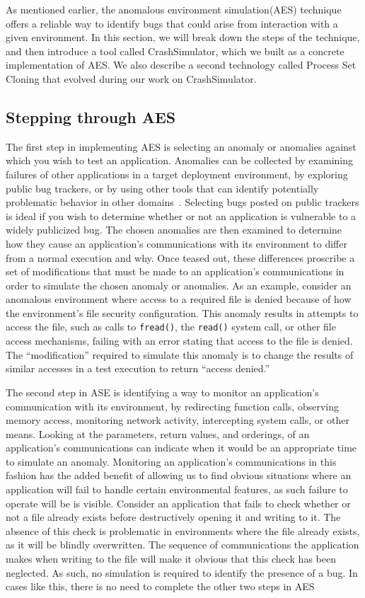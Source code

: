 As mentioned earlier,
the anomalous environment simulation(AES) technique
offers a reliable way to identify bugs
that could arise from interaction with a given environment.
In this section,
we will break down the steps of the technique,
and then introduce a tool called CrashSimulator,
which we built as a concrete implementation of AES.
We also describe a second technology
called Process Set Cloning
that evolved during our work on CrashSimulator.


\subsection{Stepping through AES}

The first step in implementing AES
is selecting an anomaly or anomalies
against which you wish to test an application.
Anomalies can be collected
by examining failures of other applications
in a target deployment environment,
by exploring public bug trackers,
or by using other tools that can identify
potentially problematic behavior in other domains~\cite{Zhuang_NSDI_2014,
rasley2015detecting}.
Selecting bugs posted on public trackers
is ideal if you wish to determine
whether or not an application
is vulnerable to a widely publicized bug.
The chosen anomalies are then examined
to determine how they cause an application's communications
with its environment
to differ from a normal execution and why.
Once teased out,
these differences proscribe
a set of modifications
that must be made to an application's communications
in order to simulate the chosen anomaly or anomalies.
As an example,
consider an anomalous environment
where access to a required file is denied because of
how the environment's file security configuration.
This anomaly results in attempts to access the file,
such as calls to {\tt fread()},
the {\tt read()} system call,
or other file access mechanisms,
failing with an error stating that access to the file is denied.
The ``modification'' required to simulate this anomaly
is to change the results of similar accesses
in a test execution
to return ``access denied.''

The second step in ASE
is identifying
a way to monitor an application's communication
with its environment,
by redirecting function calls,
observing memory access,
monitoring network activity,
intercepting system calls,
or other means.
Looking at the parameters,
return values,
and orderings,
of an application's communications
can indicate
when it would be an appropriate time to simulate an anomaly.
Monitoring an application's communications
in this fashion
has the added benefit
of allowing us to find obvious situations
where an application will fail
to handle certain environmental features,
as such failure to operate will be
is visible.
Consider an application that fails to check whether or not
a file already exists
before destructively opening it and writing to it.
The absence of this check
is problematic in environments where the file already exists,
as it will be blindly overwritten.
The sequence of communications
the application makes when writing to the file
will make it obvious that this check has been neglected.
As such,
no simulation is required to identify the presence of a bug.
In cases like this,
there is no need to complete the other two steps in AES

